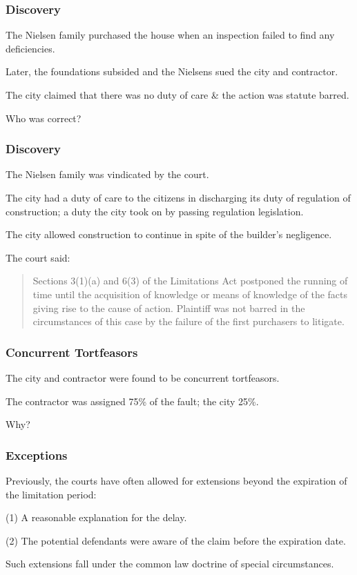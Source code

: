 \begin{frame}
\frametitle{Discovery}

The Nielsen family purchased the house when an inspection failed to find any deficiencies.

Later, the foundations subsided and the Nielsens sued the city and contractor.

The city claimed that there was no duty of care \& the action was statute barred.

Who was correct?

\end{frame}



\begin{frame}
\frametitle{Discovery}

The Nielsen family was vindicated by the court.

The city had a duty of care to the citizens in discharging its duty of regulation of construction; a duty the city took on by passing regulation legislation. 

The city allowed construction to continue in spite of the builder's negligence.

The court said:

\begin{quote}
Sections 3(1)(a) and 6(3) of the Limitations Act postponed the running of time until the acquisition of knowledge or means of knowledge of the facts giving rise to the cause of action. Plaintiff was not barred in the circumstances of this case by the failure of the first purchasers to litigate.
\end{quote}

\end{frame}



\begin{frame}
\frametitle{Concurrent Tortfeasors}

The city and contractor were found to be concurrent tortfeasors.

The contractor was assigned 75\% of the fault; the city 25\%.

Why?

\end{frame}


\begin{frame}
\frametitle{Exceptions}

Previously, the courts have often allowed for extensions beyond the expiration of the limitation period:

(1) A reasonable explanation for the delay.

(2) The potential defendants were aware of the claim before the expiration date.

Such extensions fall under the common law doctrine of special circumstances.

\end{frame}




